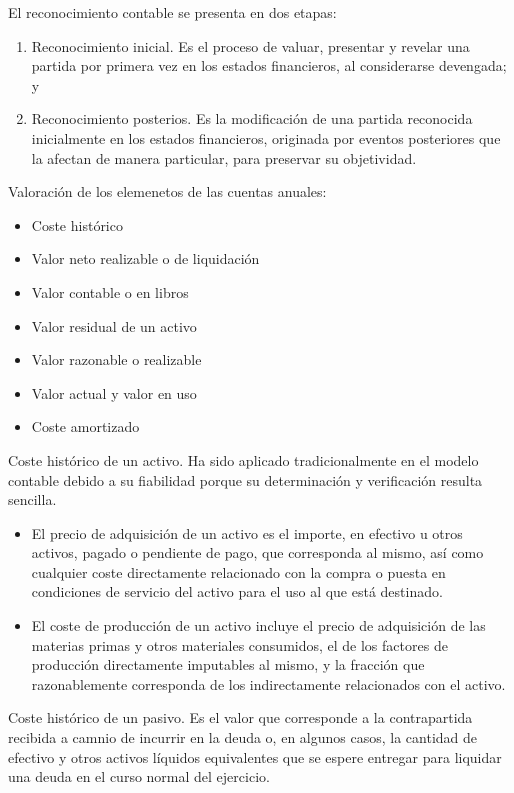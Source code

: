 El reconocimiento contable se presenta en dos etapas:
\begin{enumerate}
    \item Reconocimiento inicial. Es el proceso de valuar, presentar y revelar una partida por primera vez en los estados financieros, al considerarse devengada; y
    \item Reconocimiento posterios. Es la modificación de una partida reconocida inicialmente en los estados financieros, originada por eventos posteriores que la afectan de manera particular, para preservar su objetividad.
\end{enumerate}

Valoración de los elemenetos de las cuentas anuales:
\begin{itemize}
    \item Coste histórico
    \item Valor neto realizable o de liquidación
    \item Valor contable o en libros
    \item Valor residual de un activo
    \item Valor razonable o realizable
    \item Valor actual y valor en uso
    \item Coste amortizado
\end{itemize}

Coste histórico de un activo.
Ha sido aplicado tradicionalmente en el modelo contable debido a su fiabilidad porque su determinación y verificación resulta sencilla.
\begin{itemize}
    \item El precio de adquisición de un activo es el importe, en efectivo u otros activos, pagado o pendiente de pago, que corresponda al mismo, así como cualquier coste directamente relacionado con la compra o puesta en condiciones de servicio del activo para el uso al que está destinado.
    \item El coste de producción de un activo incluye el precio de adquisición de las materias primas y otros materiales consumidos, el de los factores de producción directamente imputables al mismo, y la fracción que razonablemente corresponda de los indirectamente relacionados con el activo.
\end{itemize}

Coste histórico de un pasivo.
Es el valor que corresponde a la contrapartida recibida a camnio de incurrir en la deuda o, en algunos casos, la cantidad de efectivo y otros activos líquidos equivalentes que se espere entregar para liquidar una deuda en el curso normal del ejercicio.

